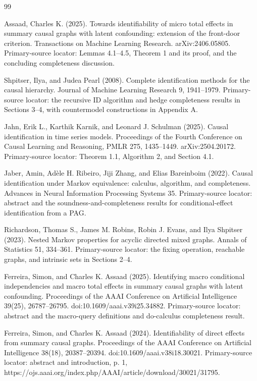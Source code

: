 \documentclass{article}
\begin{document}
\begin{thebibliography}{99}

   Assaad, Charles K. (2025). Towards identifiability of micro total effects in summary causal graphs with latent confounding: extension of the front-door criterion. Transactions on Machine Learning Research. arXiv:2406.05805. Primary-source locator: Lemmas 4.1--4.5, Theorem 1 and its proof, and the concluding completeness discussion.

   Shpitser, Ilya, and Judea Pearl (2008). Complete identification methods for the causal hierarchy. Journal of Machine Learning Research 9, 1941--1979. Primary-source locator: the recursive ID algorithm and hedge completeness results in Sections 3--4, with countermodel constructions in Appendix A.

   Jahn, Erik L., Karthik Karnik, and Leonard J. Schulman (2025). Causal identification in time series models. Proceedings of the Fourth Conference on Causal Learning and Reasoning, PMLR 275, 1435--1449. arXiv:2504.20172. Primary-source locator: Theorem 1.1, Algorithm 2, and Section 4.1.

   Jaber, Amin, Adèle H. Ribeiro, Jiji Zhang, and Elias Bareinboim (2022). Causal identification under Markov equivalence: calculus, algorithm, and completeness. Advances in Neural Information Processing Systems 35. Primary-source locator: abstract and the soundness-and-completeness results for conditional-effect identification from a PAG.

   Richardson, Thomas S., James M. Robins, Robin J. Evans, and Ilya Shpitser (2023). Nested Markov properties for acyclic directed mixed graphs. Annals of Statistics 51, 334--361. Primary-source locator: the fixing operation, reachable graphs, and intrinsic sets in Sections 2--4.

   Ferreira, Simon, and Charles K. Assaad (2025). Identifying macro conditional independencies and macro total effects in summary causal graphs with latent confounding. Proceedings of the AAAI Conference on Artificial Intelligence 39(25), 26787--26795. doi:10.1609/aaai.v39i25.34882. Primary-source locator: abstract and the macro-query definitions and do-calculus completeness result.

   Ferreira, Simon, and Charles K. Assaad (2024). Identifiability of direct effects from summary causal graphs. Proceedings of the AAAI Conference on Artificial Intelligence 38(18), 20387--20394. doi:10.1609/aaai.v38i18.30021. Primary-source locator: abstract and introduction, p. 1, https://ojs.aaai.org/index.php/AAAI/article/download/30021/31795.


\end{thebibliography}
\end{document}
